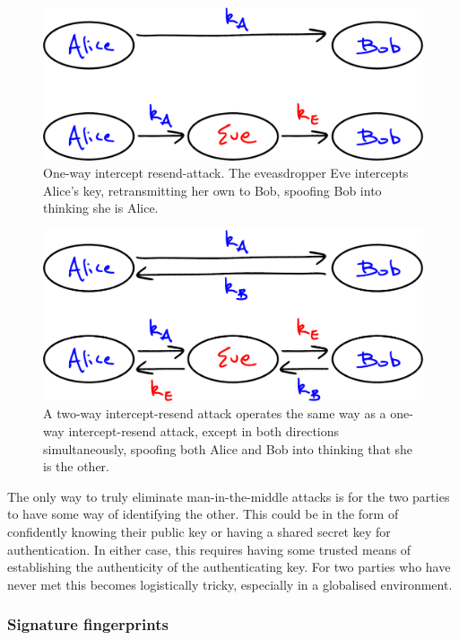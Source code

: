 \begin{figure}[!htb]
	\centering
	\includegraphics[width=\columnwidth]{figures/Intercept_resend_1}
	\caption{One-way intercept resend-attack. The eveasdropper Eve intercepts Alice's key, retransmitting her own to Bob, spoofing Bob into thinking she is Alice.} \label{fig:MIM_1}
\end{figure}

\begin{figure}[!htb]
	\centering
	\includegraphics[width=\columnwidth]{figures/Intercept_resend_2}
	\caption{A two-way intercept-resend attack operates the same way as a one-way intercept-resend attack, except in both directions simultaneously, spoofing both Alice and Bob into thinking that she is the other.} \label{fig:MIM_2}
\end{figure}

The only way to truly eliminate man-in-the-middle attacks is for the two parties to have some way of identifying the other. This could be in the form of confidently knowing their public key or having a shared secret key for authentication. In either case, this requires having some trusted means of establishing the authenticity of the authenticating key. For two parties who have never met this becomes logistically tricky, especially in a globalised environment.

\subsubsection{Signature fingerprints}

